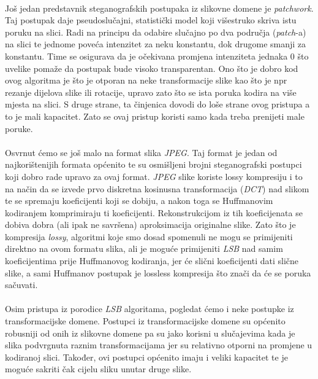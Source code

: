 \documentclass[times, utf8, seminar]{fer}
\begin{document}
\paragraph{}
Još jedan predstavnik steganografskih postupaka iz slikovne domene je \textit{patchwork}. Taj postupak daje pseudoslučajni, statistički model koji višestruko skriva istu poruku na slici. Radi na principu da odabire slučajno po dva područja (\textit{patch}-a) na slici te jednome poveća intenzitet za neku konstantu, dok drugome smanji za konstantu. Time se osigurava da je očekivana promjena intenziteta jednaka 0 što uvelike pomaže da postupak bude visoko transparentan. Ono što je dobro kod ovog algoritma je što je otporan na neke transformacije slike kao što je npr rezanje dijelova slike ili rotacije, upravo zato što se ista poruka kodira na više mjesta na slici. S druge strane, ta činjenica dovodi do loše strane ovog pristupa a to je mali kapacitet. Zato se ovaj pristup koristi samo kada treba prenijeti male poruke.
\paragraph{}
Osvrnut ćemo se još malo na format slika \textit{JPEG}. Taj format je jedan od najkorištenijih formata općenito te su osmišljeni brojni steganografski postupci koji dobro rade upravo za ovaj format. \textit{JPEG} slike koriste lossy kompresiju i to na način da se izvede prvo diskretna kosinusna transformacija (\textit{DCT}) nad slikom te se spremaju koeficijenti koji se dobiju, a nakon toga se Huffmanovim kodiranjem komprimiraju ti koeficijenti. Rekonstrukcijom iz tih koeficijenata se dobiva dobra (ali ipak ne savršena) aproksimacija originalne slike. Zato što je kompresija \textit{lossy}, algoritmi koje smo dosad spomenuli ne mogu se primijeniti direktno na ovom formatu slika, ali je moguće primijeniti \textit{LSB} nad samim koeficijentima prije Huffmanovog kodiranja, jer će slični koeficijenti dati slične slike, a sami Huffmanov postupak je lossless kompresija što znači da će se poruka sačuvati.
\paragraph{}
Osim pristupa iz porodice \textit{LSB} algoritama, pogledat ćemo i neke postupke iz transformacijske domene. Postupci iz transformacijske domene su općenito robusniji od onih iz slikovne domene pa su jako korisni u slučajevima kada je slika podvrgnuta raznim transformacijama jer su relativno otporni na promjene u kodiranoj slici. Također, ovi postupci općenito imaju i veliki kapacitet te je moguće sakriti čak cijelu sliku unutar druge slike.
\end{document}
